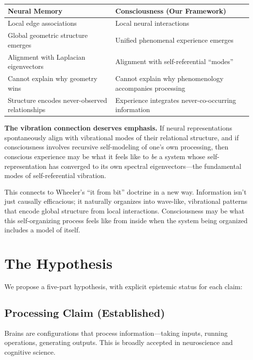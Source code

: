 \documentclass[12pt,a4paper]{article}
\begin{document}
\begin{table}[h]
\centering
\begin{tabular}{@{}p{}p{}@{}}
\toprule
\textbf{Neural Memory} & \textbf{Consciousness (Our Framework)} \\
\midrule
Local edge associations & Local neural interactions \\
Global geometric structure emerges & Unified phenomenal experience emerges \\
Alignment with Laplacian eigenvectors & Alignment with self-referential ``modes'' \\
Cannot explain why geometry wins & Cannot explain why phenomenology accompanies processing \\
Structure encodes never-observed relationships & Experience integrates never-co-occurring information \\
\bottomrule
\end{tabular}
\end{table}

\textbf{The vibration connection deserves emphasis.} If neural representations spontaneously align with vibrational modes of their relational structure, and if consciousness involves recursive self-modeling of one's own processing, then conscious experience may be what it feels like to \textit{be} a system whose self-representation has converged to its own spectral eigenvectors---the fundamental modes of self-referential vibration.

This connects to Wheeler's ``it from bit'' doctrine in a new way. Information isn't just causally efficacious; it naturally organizes into wave-like, vibrational patterns that encode global structure from local interactions. Consciousness may be what this self-organizing process feels like from inside when the system being organized includes a model of itself.

\section{The Hypothesis}

We propose a five-part hypothesis, with explicit epistemic status for each claim:

\subsection{Processing Claim (Established)}

Brains are configurations that process information---taking inputs, running operations, generating outputs. This is broadly accepted in neuroscience and cognitive science.
\end{document}

